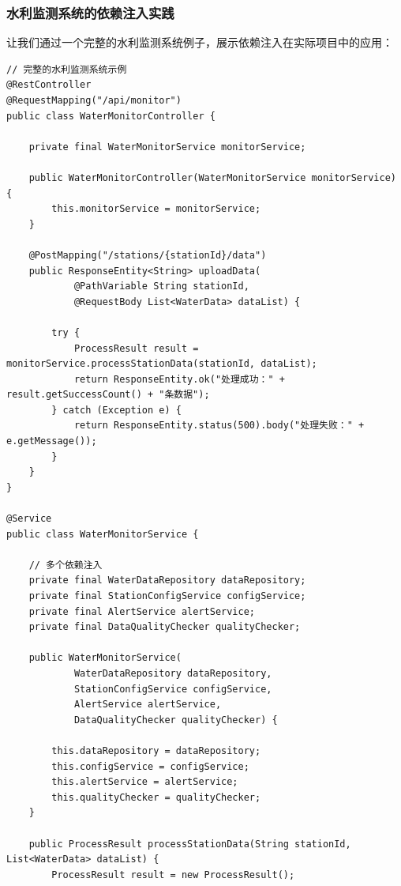 \hypertarget{ux6c34ux5229ux76d1ux6d4bux7cfbux7edfux7684ux4f9dux8d56ux6ce8ux5165ux5b9eux8df5}{%
\subsubsection{水利监测系统的依赖注入实践}\label{ux6c34ux5229ux76d1ux6d4bux7cfbux7edfux7684ux4f9dux8d56ux6ce8ux5165ux5b9eux8df5}}

让我们通过一个完整的水利监测系统例子，展示依赖注入在实际项目中的应用：

\begin{lstlisting}[style=java]
// 完整的水利监测系统示例
@RestController
@RequestMapping("/api/monitor")
public class WaterMonitorController {
    
    private final WaterMonitorService monitorService;
    
    public WaterMonitorController(WaterMonitorService monitorService) {
        this.monitorService = monitorService;
    }
    
    @PostMapping("/stations/{stationId}/data")
    public ResponseEntity<String> uploadData(
            @PathVariable String stationId,
            @RequestBody List<WaterData> dataList) {
        
        try {
            ProcessResult result = monitorService.processStationData(stationId, dataList);
            return ResponseEntity.ok("处理成功：" + result.getSuccessCount() + "条数据");
        } catch (Exception e) {
            return ResponseEntity.status(500).body("处理失败：" + e.getMessage());
        }
    }
}

@Service
public class WaterMonitorService {
    
    // 多个依赖注入
    private final WaterDataRepository dataRepository;
    private final StationConfigService configService;
    private final AlertService alertService;
    private final DataQualityChecker qualityChecker;
    
    public WaterMonitorService(
            WaterDataRepository dataRepository,
            StationConfigService configService,
            AlertService alertService,
            DataQualityChecker qualityChecker) {
        
        this.dataRepository = dataRepository;
        this.configService = configService;
        this.alertService = alertService;
        this.qualityChecker = qualityChecker;
    }
    
    public ProcessResult processStationData(String stationId, List<WaterData> dataList) {
        ProcessResult result = new ProcessResult();
        

\end{lstlisting}
